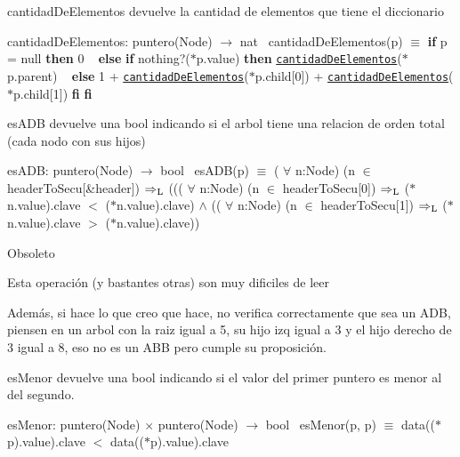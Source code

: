 \begin{DoxyParagraph}{cantidad\+De\+Elementos}
devuelve la cantidad de elementos que tiene el diccionario

cantidad\+De\+Elementos\+: puntero(\+Node) $\to$ nat~\newline
 cantidad\+De\+Elementos(p) $\equiv$ {\bfseries if} p = null {\bfseries then} 0 ~\newline
 {\bfseries else} {\bfseries if} nothing?($\ast$p.value) {\bfseries then} \href{axiomas.html#cantidadDeElementos}{\tt cantidad\+De\+Elementos}($\ast$p.parent) ~\newline
 {\bfseries else} 1 + \href{axiomas.html#cantidadDeElementos}{\tt cantidad\+De\+Elementos}($\ast$p.child\mbox{[}0\mbox{]}) + \href{axiomas.html#cantidadDeElementos}{\tt cantidad\+De\+Elementos}($\ast$p.child\mbox{[}1\mbox{]}) {\bfseries fi} {\bfseries fi} 
\end{DoxyParagraph}


\begin{DoxyParagraph}{es\+A\+DB}
devuelve una bool indicando si el arbol tiene una relacion de orden total (cada nodo con sus hijos)

es\+A\+DB\+: puntero(\+Node) $\to$ bool~\newline
 es\+A\+D\+B(p) $\equiv$ ( $\forall$ n\+:Node) (n $\in$ header\+To\+Secu\mbox{[}\&header\mbox{]}) $\Rightarrow_{\rm L}$ ((( $\forall$ n\textquotesingle{}\+:Node) (n\textquotesingle{} $\in$ header\+To\+Secu\mbox{[}0\mbox{]}) $\Rightarrow_{\rm L}$ ($\ast$n\textquotesingle{}.value).clave $<$ ($\ast$n.value).clave) $\land$ (( $\forall$ n\textquotesingle{}\textquotesingle{}\+:Node) (n\textquotesingle{}\textquotesingle{} $\in$ header\+To\+Secu\mbox{[}1\mbox{]}) $\Rightarrow_{\rm L}$ ($\ast$n\textquotesingle{}\textquotesingle{}.value).clave $>$ ($\ast$n.value).clave)) 
\end{DoxyParagraph}


\begin{DoxyRefDesc}{Obsoleto}
\item[\hyperlink{deprecated__deprecated000001}{Obsoleto}]Esta operación (y bastantes otras) son muy dificiles de leer 

Además, si hace lo que creo que hace, no verifica correctamente que sea un A\+DB, piensen en un arbol con la raiz igual a 5, su hijo izq igual a 3 y el hijo derecho de 3 igual a 8, eso no es un A\+BB pero cumple su proposición.\end{DoxyRefDesc}


\begin{DoxyParagraph}{es\+Menor}
devuelve una bool indicando si el valor del primer puntero es menor al del segundo.

es\+Menor\+: puntero(\+Node) $\times$ puntero(\+Node) $\to$ bool~\newline
 es\+Menor(p, p\textquotesingle{}) $\equiv$ data(($\ast$p).value).clave $<$ data(($\ast$p).value).clave 
\end{DoxyParagraph}


